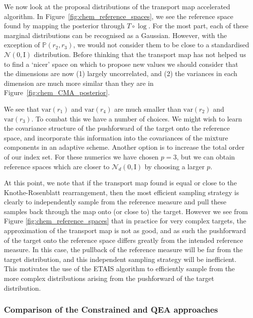\documentclass[final]{siamltex}
\newcommand{\edit}[1]{{\color{red} #1}}
\begin{document}
\edit{
We now look at the proposal distributions of the transport map accelerated algorithm. In Figure~\ref{fig:chem_reference_spaces}, we see the reference space found by mapping the posterior through $T\circ\log$.} For the most part, each of these marginal distributions can be recognised as a Gaussian. However, with the exception of $\mathbb{P}(r_2,r_3)$, we would not consider them to be close to a standardised $\mathcal{N}(0, \text{I})$ distribution. Before thinking that the transport map has not helped us to find a `nicer' space on which to propose new values we should consider that the dimensions are now (1) largely uncorrelated, and (2) the variances in each dimension are much more similar than they are in Figure~\ref{fig:chem_CMA_posterior}.


\edit{We see that
$\text{var}(r_1)$ and $\text{var}(r_4)$ are much smaller than
$\text{var}(r_2)$ and $\text{var}(r_3)$. To combat this we have a
number of choices.} We might wish to learn the covariance structure of
the pushforward of the target onto the reference space, and
incorporate this information into the covariances of the mixture
components in an adaptive scheme. Another option is to increase the
total order of our index set. For these numerics we have chosen $p=3$,
but we can obtain reference spaces which are closer to
$\mathcal{N}_d(0, \text{I})$ by choosing a larger $p$.

\edit{At this point, we note that if the transport map found is equal
  or close to the Knothe-Rosenblatt rearrangement, then the most
  efficient sampling strategy is clearly to independently sample from the
  reference measure and pull these samples back through the map onto
  (or close to) the target. However we see from Figure
  \ref{fig:chem_reference_spaces} that in practice for very complex
  targets, the approximation of the transport map is not as good, and
  as such the pushforward of the target onto the reference
  space differs greatly from the intended reference measure. In
  this case, the pullback of the reference measure will be far from
  the target distribution, and this independent sampling strategy
  will be inefficient. This motivates the use of the ETAIS algorithm
  to efficiently sample from the more complex distributions arising
  from the pushforward of the target distribution. %
  }

\subsubsection{Comparison of the Constrained and QEA approaches}
\end{document}
